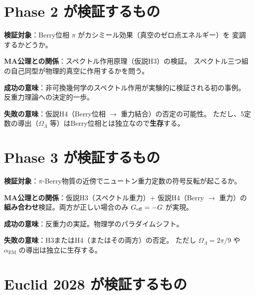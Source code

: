 \section{Phase 2 が検証するもの}
\label{sec:16.3}

\begin{experimentbox}
\textbf{検証対象}：Berry位相 $\pi$ がカシミール効果（真空のゼロ点エネルギー）を
変調するかどうか。

\medskip
\textbf{MA公理との関係}：スペクトル作用原理（仮説H3）の検証。
スペクトル三つ組の自己同型が物理的真空に作用するかを問う。

\medskip
\textbf{成功の意味}：非可換幾何学のスペクトル作用が実験的に検証される初の事例。
反重力理論への決定的一歩。

\medskip
\textbf{失敗の意味}：仮説H4（Berry位相 $\to$ 重力結合）の否定の可能性。
ただし、5定数の導出（$\Omega_\Lambda$ 等）はBerry位相とは独立なので\textbf{生存}する。
\end{experimentbox}

\section{Phase 3 が検証するもの}
\label{sec:16.4}

\begin{experimentbox}[Phase 3 $\to$ $\Geff = -G$（反重力の直接検証）]
\textbf{検証対象}：$\pi$-Berry物質の近傍でニュートン重力定数の符号反転が起こるか。

\medskip
\textbf{MA公理との関係}：仮説H3（スペクトル重力）+ 仮説H4（Berry $\to$ 重力）の
\textbf{組み合わせ}検証。両方が正しい場合のみ $\Geff = -G$ が実現。

\medskip
\textbf{成功の意味}：反重力の実証。物理学のパラダイムシフト。

\medskip
\textbf{失敗の意味}：H3またはH4（またはその両方）の否定。
ただし $\Omega_\Lambda = 2\pi/9$ や $\alpha_{\mathrm{EM}}$ の導出は独立に生存する。
\end{experimentbox}

\section{Euclid 2028 が検証するもの}
\label{sec:16.5}

